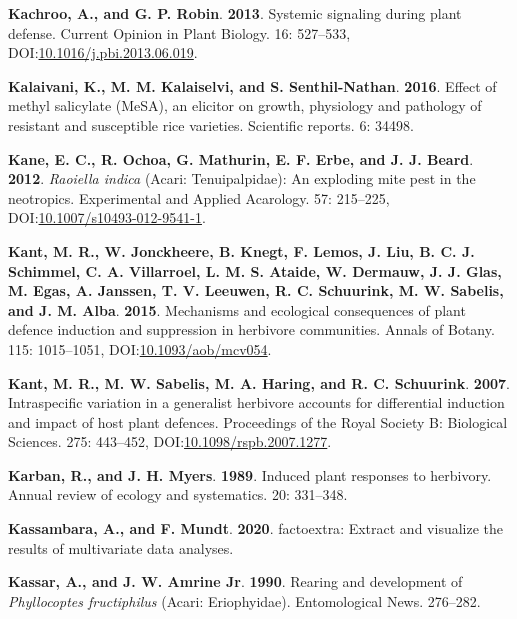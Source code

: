 \documentclass[12pt,final,CPage]{ufthesis}
\newlength{\cslhangindent}
\newenvironment{CSLReferences}[2] %
{%
	\setlength{\parindent}{0pt}
	\ifodd #1 \everypar{\setlength{\hangindent}{\cslhangindent}}\ignorespaces\fi
	\ifnum #2 > 0
	\setlength{\parskip}{#2\baselineskip}
	\fi
}%
{}
\begin{document}
{\begin{CSLReferences}{1}{0}
  \leavevmode{}%
  \textbf{Kachroo, A., and G. P. Robin}. \textbf{2013}. Systemic signaling during plant defense. Current Opinion in Plant Biology. 16: 527--533, DOI:\href{https://doi.org/10.1016/j.pbi.2013.06.019}{10.1016/j.pbi.2013.06.019}.

  \leavevmode{}%
  \textbf{Kalaivani, K., M. M. Kalaiselvi, and S. Senthil-Nathan}. \textbf{2016}. Effect of methyl salicylate {(MeSA)}, an elicitor on growth, physiology and pathology of resistant and susceptible rice varieties. Scientific reports. 6: 34498.

  \leavevmode{}%
  \textbf{Kane, E. C., R. Ochoa, G. Mathurin, E. F. Erbe, and J. J. Beard}. \textbf{2012}. {\emph{Raoiella indica}} ({Acari}: {Tenuipalpidae}): An exploding mite pest in the neotropics. Experimental and Applied Acarology. 57: 215--225, DOI:\href{https://doi.org/10.1007/s10493-012-9541-1}{10.1007/s10493-012-9541-1}.

  \leavevmode{}%
  \textbf{Kant, M. R., W. Jonckheere, B. Knegt, F. Lemos, J. Liu, B. C. J. Schimmel, C. A. Villarroel, L. M. S. Ataide, W. Dermauw, J. J. Glas, M. Egas, A. Janssen, T. V. Leeuwen, R. C. Schuurink, M. W. Sabelis, and J. M. Alba}. \textbf{2015}. Mechanisms and ecological consequences of plant defence induction and suppression in herbivore communities. Annals of Botany. 115: 1015--1051, DOI:\href{https://doi.org/10.1093/aob/mcv054}{10.1093/aob/mcv054}.

  \leavevmode{}%
  \textbf{Kant, M. R., M. W. Sabelis, M. A. Haring, and R. C. Schuurink}. \textbf{2007}. Intraspecific variation in a generalist herbivore accounts for differential induction and impact of host plant defences. Proceedings of the Royal Society B: Biological Sciences. 275: 443--452, DOI:\href{https://doi.org/10.1098/rspb.2007.1277}{10.1098/rspb.2007.1277}.

  \leavevmode{}%
  \textbf{Karban, R., and J. H. Myers}. \textbf{1989}. Induced plant responses to herbivory. Annual review of ecology and systematics. 20: 331--348.

  \leavevmode{}%
  \textbf{Kassambara, A., and F. Mundt}. \textbf{2020}. {factoextra}: Extract and visualize the results of multivariate data analyses.

  \leavevmode{}%
  \textbf{Kassar, A., and J. W. Amrine Jr}. \textbf{1990}. Rearing and development of {\emph{Phyllocoptes fructiphilus}} ({Acari}: {Eriophyidae}). Entomological News. 276--282.


\end{CSLReferences}}
\end{document}
